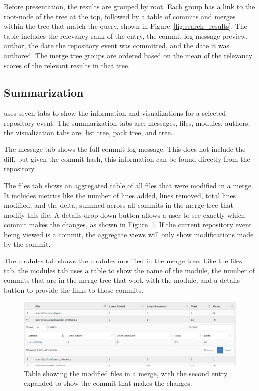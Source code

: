 Before presentation, the results are grouped by \mt root. Each group
has a link to the root-node of the tree at the top, followed by a table
of commits and merges within the tree that match the query, shown in
Figure~\ref{fig:search_results}. The table includes the relevancy rank
of the entry, the commit log message preview, author, the date the
repository event was committed, and the date it was authored. The merge
tree groups are ordered based on the mean of the relevancy scores of the
relevant results in that tree.

\subsection{Summarization}
\label{sub:summarization}

\tool uses seven tabs to show the information and visualizations for a
selected repository event. The summarization tabs are; messages, files, modules,
authors; the visualization tabs are; list tree, pack tree, and \rt tree.

The message tab shows the full commit log message. This does not include
the diff, but given the commit hash, this information can be found
directly from the repository.

The files tab shows an aggregated table of all files that were modified
in a merge. It includes metrics like the number of lines added, lines
removed, total lines modified, and the delta, summed across all commits
in the merge tree that modify this file. A details drop-down button
allows a user to see exactly which commit makes the changes, as shown in
Figure~\ref{fig:linvis_files}. If the current repository event being
viewed is a commit, the aggregate views will only show modifications
made by the commit.

The modules tab shows the modules modified in the merge tree. Like the
files tab, the modules tab uses a table to show the name of the module,
the number of commits that are in the merge tree that work with the
module, and a details button to provide the links to those commits.

\begin{figure}[htpb]
  \centering
  \includegraphics[width=\linewidth]{figures/linvis/linvis_files.png}
  \caption{Table showing the modified files in a merge, with the second
  entry expanded to show the commit that makes the changes.}
  \label{fig:linvis_files}
\end{figure}

